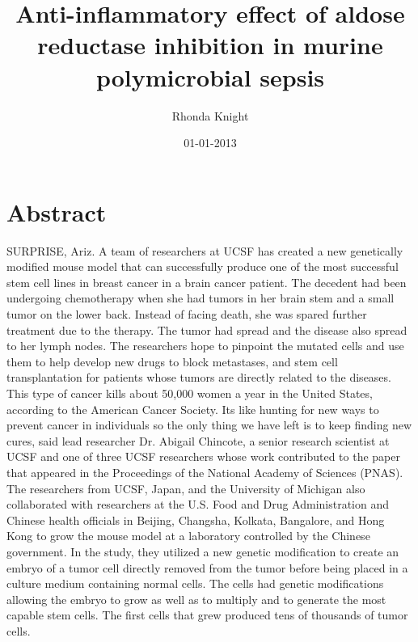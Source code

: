 \documentclass{article}%
\title{Anti{-}inflammatory effect of aldose reductase inhibition in murine polymicrobial sepsis}%
\author{Rhonda Knight}%
\affil{Instituto de Biologa Molecular y Celular de Plantas, Universidad Politcnica de Valencia{-}C.S.I.C, Ciudad Politcnica de la Innovacin, Valencia, Spain}%
\date{01{-}01{-}2013}%
\begin{document}
%
\normalsize%
\maketitle%
\section{Abstract}%
\label{sec:Abstract}%
SURPRISE, Ariz.  A team of researchers at UCSF has created a new genetically modified mouse model that can successfully produce one of the most successful stem cell lines in breast cancer  in a brain cancer patient.\newline%
The decedent had been undergoing chemotherapy when she had tumors in her brain stem and a small tumor on the lower back. Instead of facing death, she was spared further treatment due to the therapy. The tumor had spread and the disease also spread to her lymph nodes.\newline%
The researchers hope to pinpoint the mutated cells and use them to help develop new drugs to block metastases, and stem cell transplantation for patients whose tumors are directly related to the diseases.\newline%
This type of cancer kills about 50,000 women a year in the United States, according to the American Cancer Society.\newline%
Its like hunting for new ways to prevent cancer in individuals so the only thing we have left is to keep finding new cures, said lead researcher Dr. Abigail Chincote, a senior research scientist at UCSF and one of three UCSF researchers whose work contributed to the paper that appeared in the Proceedings of the National Academy of Sciences (PNAS).\newline%
The researchers from UCSF, Japan, and the University of Michigan also collaborated with researchers at the U.S. Food and Drug Administration and Chinese health officials in Beijing, Changsha, Kolkata, Bangalore, and Hong Kong to grow the mouse model at a laboratory controlled by the Chinese government.\newline%
In the study, they utilized a new genetic modification to create an embryo of a tumor cell directly removed from the tumor before being placed in a culture medium containing normal cells. The cells had genetic modifications allowing the embryo to grow as well as to multiply and to generate the most capable stem cells.\newline%
The first cells that grew produced tens of thousands of tumor cells.\newline%
\end{document}
